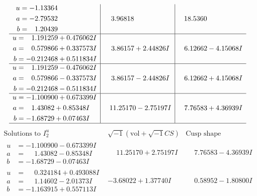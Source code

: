 \documentclass[1p]{elsarticle_modified}
\theoremstyle{definition}
\newcommand{\I}{\sqrt{-1}}
\begin{document}
$$\begin{array}{c|c|c}
\begin{aligned}
u &= -1.13364\phantom{ +0.000000I} \\
a &= -2.79532\phantom{ +0.000000I} \\
b &= \phantom{-}1.20439\phantom{ +0.000000I}\end{aligned}
 & \phantom{-}3.96818\phantom{ +0.000000I} & \phantom{-}18.5360\phantom{ +0.000000I} \\ \hline\begin{aligned}
u &= \phantom{-}1.191259 + 0.476062 I \\
a &= \phantom{-}0.579866 + 0.337573 I \\
b &= -0.212468 + 0.511834 I\end{aligned}
 & \phantom{-}3.86157 + 2.44826 I & \phantom{-}6.12662 - 4.15068 I \\ \hline\begin{aligned}
u &= \phantom{-}1.191259 - 0.476062 I \\
a &= \phantom{-}0.579866 - 0.337573 I \\
b &= -0.212468 - 0.511834 I\end{aligned}
 & \phantom{-}3.86157 - 2.44826 I & \phantom{-}6.12662 + 4.15068 I \\ \hline\begin{aligned}
u &= -1.100900 + 0.673399 I \\
a &= \phantom{-}1.43082 + 0.85348 I \\
b &= -1.68729 + 0.07463 I\end{aligned}
 & \phantom{-}11.25170 - 2.75197 I & \phantom{-}7.76583 + 4.36939 I\\
 \hline 
 \end{array}$$\newpage$$\begin{array}{c|c|c}  
\text{Solutions to }I^u_{2}& \I (\text{vol} + \sqrt{-1}CS) & \text{Cusp shape}\\
 \hline 
\begin{aligned}
u &= -1.100900 - 0.673399 I \\
a &= \phantom{-}1.43082 - 0.85348 I \\
b &= -1.68729 - 0.07463 I\end{aligned}
 & \phantom{-}11.25170 + 2.75197 I & \phantom{-}7.76583 - 4.36939 I \\ \hline\begin{aligned}
u &= \phantom{-}0.324184 + 0.493088 I \\
a &= \phantom{-}1.14602 - 2.01373 I \\
b &= -1.163915 + 0.557113 I\end{aligned}
 & -3.68022 + 1.37740 I & \phantom{-}0.58952 - 1.80800 I \\ \hline\begin{aligned}

\end{aligned}
\end{array}$$
\end{document}
